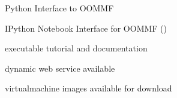 \begin{workpackage}
\begin{wpdelivs}
  \begin{wpdeliv}[due=9,id=oommf-py-raw,dissem=PU,nature=O]
      {Python Interface to OOMMF}
\end{wpdeliv}
  \begin{wpdeliv}[due=15,id=oommf-nb,dissem=PU,nature=DEM]
      {IPython Notebook Interface for OOMMF (\OOMMFNB{})}
\end{wpdeliv}
  \begin{wpdeliv}[due=21,id=oommf-nb-documentation,dissem=PU,nature=DEC]
      {\OOMMFNB{}    executable tutorial and documentation}
\end{wpdeliv}
  \begin{wpdeliv}[due=24,id=oommf-nb-tmp,dissem=PU,nature=DEC]
      {\OOMMFNB{} dynamic web service available}
\end{wpdeliv}
  \begin{wpdeliv}[due=24,id=oommf-nb-virtual,dissem=PU,nature=O]
      {\OOMMFNB{} virtualmachine images available for download}
\end{wpdeliv}
\end{wpdelivs}
\end{workpackage}

